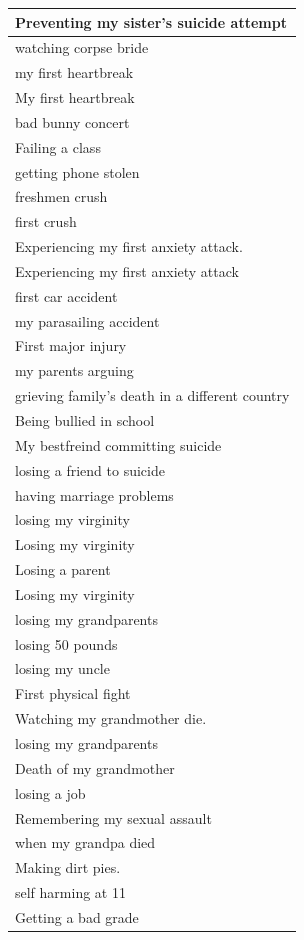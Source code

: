 \documentclass[
  .7em,
  letterpaper,
  DIV=11,
  numbers=noendperiod]{scrartcl}
\begin{document}
\begin{table}
\begin{tabular}{l}
\hline
Preventing my sister's suicide attempt\\
\hline
watching corpse bride\\
\hline
my first heartbreak\\
\hline
My first heartbreak\\
\hline
bad bunny concert\\
\hline
Failing a class\\
\hline
getting phone stolen\\
\hline
freshmen crush\\
\hline
first crush\\
\hline
Experiencing my first anxiety attack.\\
\hline
Experiencing my first anxiety attack\\
\hline
first car accident\\
\hline
my parasailing accident\\
\hline
First major injury\\
\hline
my parents arguing\\
\hline
grieving family's death in a different country\\
\hline
Being bullied in school\\
\hline
My bestfreind committing suicide\\
\hline
losing a friend to suicide\\
\hline
having marriage problems\\
\hline
losing my virginity\\
\hline
Losing my virginity\\
\hline
Losing a parent\\
\hline
Losing my virginity\\
\hline
losing my grandparents\\
\hline
losing 50 pounds\\
\hline
losing my uncle\\
\hline
First physical fight\\
\hline
Watching my grandmother die.\\
\hline
losing my grandparents\\
\hline
Death of my grandmother\\
\hline
losing a job\\
\hline
Remembering my sexual assault\\
\hline
when my grandpa died\\
\hline
Making dirt pies.\\
\hline
self harming at 11\\
\hline
Getting a bad grade\\

\end{tabular}
\end{table}
\end{document}
